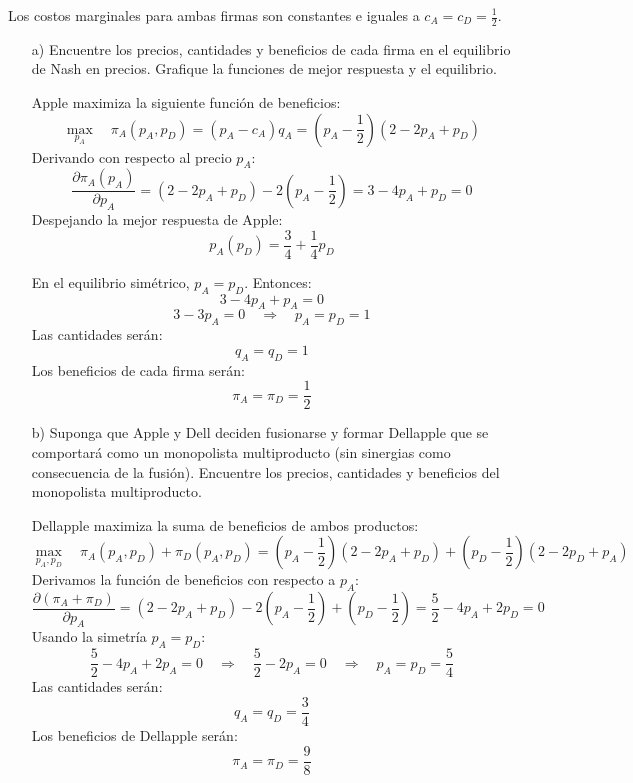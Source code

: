 \documentclass{exam}
\begin{document}
Los costos marginales para ambas firmas son constantes e iguales a \( c_A = c_D = \frac{1}{2} \).

\begin{itemize}
    \item[a)] Encuentre los precios, cantidades y beneficios de cada firma en el equilibrio de Nash en precios. Grafique la funciones de mejor respuesta y el equilibrio.
    \begin{solution}
        Apple maximiza la siguiente función de beneficios:
        \[
        \max_{p_A} \quad \pi_A(p_A, p_D) = (p_A - c_A) q_A = (p_A - \frac{1}{2}) (2 - 2 p_A + p_D)
        \]
        Derivando con respecto al precio \(p_A\):
        \[
        \frac{\partial \pi_A(p_A)}{\partial p_A} = (2 - 2 p_A + p_D) - 2(p_A - \frac{1}{2}) = 3 - 4 p_A + p_D = 0
        \]
        Despejando la mejor respuesta de Apple:
        \[
        p_A(p_D) = \frac{3}{4} + \frac{1}{4} p_D
        \]

        En el equilibrio simétrico, \( p_A = p_D \). Entonces:
        \[
        3 - 4 p_A + p_A = 0
        \]
        \[
        3 - 3 p_A = 0 \quad \Rightarrow \quad p_A = p_D = 1
        \]
        Las cantidades serán:
        \[
        q_A = q_D = 1
        \]
        Los beneficios de cada firma serán:
        \[
        \pi_A = \pi_D = \frac{1}{2}
        \]
    \end{solution}

    \item[b)] Suponga que Apple y Dell deciden fusionarse y formar Dellapple que se comportará como un monopolista multiproducto (sin sinergias como consecuencia de la fusión). Encuentre los precios, cantidades y beneficios del monopolista multiproducto.
    \begin{solution}
        Dellapple maximiza la suma de beneficios de ambos productos:
        \[
        \max_{p_A, p_D} \quad \pi_A(p_A, p_D) + \pi_D(p_A, p_D) = (p_A - \frac{1}{2}) (2 - 2 p_A + p_D) + (p_D - \frac{1}{2}) (2 - 2 p_D + p_A)
        \]
        Derivamos la función de beneficios con respecto a \(p_A\):
        \[
        \frac{\partial (\pi_A + \pi_D)}{\partial p_A} = (2 - 2 p_A + p_D) - 2(p_A - \frac{1}{2}) + (p_D - \frac{1}{2}) = \frac{5}{2} - 4 p_A + 2 p_D = 0
        \]
        Usando la simetría \( p_A = p_D \):
        \[
        \frac{5}{2} - 4 p_A + 2 p_A = 0 \quad \Rightarrow \quad \frac{5}{2} - 2 p_A = 0 \quad \Rightarrow \quad p_A = p_D = \frac{5}{4}
        \]
        Las cantidades serán:
        \[
        q_A = q_D = \frac{3}{4}
        \]
        Los beneficios de Dellapple serán:
        \[
        \pi_A = \pi_D = \frac{9}{8}
        \]
    \end{solution}


\end{itemize}
\end{document}
